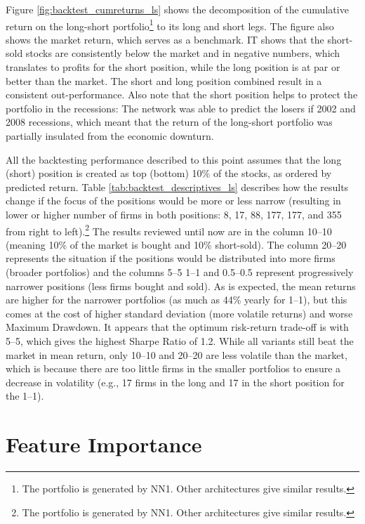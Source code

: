 		Figure \ref{fig:backtest_cumreturns_ls} shows the decomposition of the cumulative return on the long-short portfolio\footnote{The portfolio is generated by NN1. Other architectures give similar results.} to its long and short legs. The figure also shows the market return, which serves as a benchmark. IT shows that the short-sold stocks are consistently below the market and in negative numbers, which translates to profits for the short position, while the long position is at par or better than the market. The short and long position combined result in a consistent out-performance. Also note that the short position helps to protect the portfolio in the recessions: The network was able to predict the losers if 2002 and 2008 recessions, which meant that the return of the long-short portfolio was partially insulated from the economic downturn.     
		
		
		All the backtesting performance described to this point assumes that the long (short) position is created as top (bottom) 10\%  of the stocks, as ordered by predicted return. Table \ref{tab:backtest_descriptives_ls} describes how the results change if the focus of the positions would be more or less narrow (resulting in lower or higher number of firms in both positions: 8, 17, 88, 177, 177, and 355 from right to left).\footnote{The portfolio is generated by NN1. Other architectures give similar results.} The results reviewed until now are in the column 10--10 (meaning 10\% of the market is bought and 10\% short-sold). The column 20--20 represents the situation if the positions would be distributed into more firms (broader portfolios) and the columns 5--5 1--1 and 0.5--0.5 represent progressively narrower positions (less firms bought and sold). As is expected, the mean returns are higher for the narrower portfolios (as much as 44\% yearly for 1--1), but this comes at the cost of higher standard deviation (more volatile returns) and worse Maximum Drawdown. It appears that the optimum risk-return trade-off is with 5--5, which gives the highest Sharpe Ratio of 1.2. While all variants still beat the market in mean return, only 10--10 and 20--20 are less volatile than the market, which is because there are too little firms in the smaller portfolios  to ensure a decrease in volatility (e.g., 17 firms in the long and 17 in the short position for the 1--1).

	
\section{Feature Importance}
	\label{chap:global_feature_importance}
	
